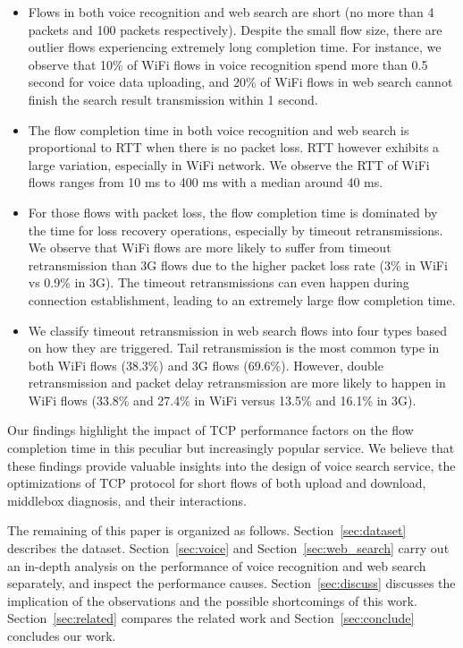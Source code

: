 \begin{itemize}
\item Flows in both voice recognition and web search are short (no more than 4 packets and 100 packets respectively). Despite the small flow size, there are outlier flows experiencing extremely long completion time. For instance, we observe that 10\% of WiFi flows in voice recognition spend more than 0.5 second for voice data uploading, and 20\% of WiFi flows in web search cannot finish the search result transmission within 1 second.

\item The flow completion time in both voice recognition and web search is proportional to RTT when there is no packet loss. RTT however exhibits a large variation, especially in WiFi network. We observe the RTT of WiFi flows ranges from 10 ms to 400 ms with a median around 40 ms. 

\item For those flows with packet loss, the flow completion time is dominated by the time for loss recovery operations, especially by timeout retransmissions. We observe that WiFi flows are more likely to suffer from timeout retransmission than 3G flows due to the higher packet loss rate (3\% in WiFi vs 0.9\% in 3G). The timeout retransmissions can even happen during connection establishment, leading to an extremely large flow completion time.

\item We classify timeout retransmission in web search flows into four types based on how they are triggered. Tail retransmission is the most common type in both WiFi flows (38.3\%) and 3G flows (69.6\%). However, double retransmission and packet delay retransmission are more likely to happen in WiFi flows (33.8\% and 27.4\% in WiFi versus 13.5\% and 16.1\% in 3G).

\end{itemize}

Our findings highlight the impact of TCP performance factors on the flow completion time in this peculiar but increasingly popular service. We believe that these findings provide valuable insights into the design of voice search service, the optimizations of TCP protocol for short flows of both upload and download, middlebox diagnosis, and their interactions.

The remaining of this paper is organized as follows. Section~\ref{sec:dataset} describes the dataset. Section~\ref{sec:voice} and Section~\ref{sec:web_search} carry out an in-depth analysis on the performance of voice recognition and web search separately, and inspect the performance causes. Section~\ref{sec:discuss} discusses the implication of the observations and the possible shortcomings of this work. Section~\ref{sec:related} compares the related work and Section~\ref{sec:conclude} concludes our work. 
